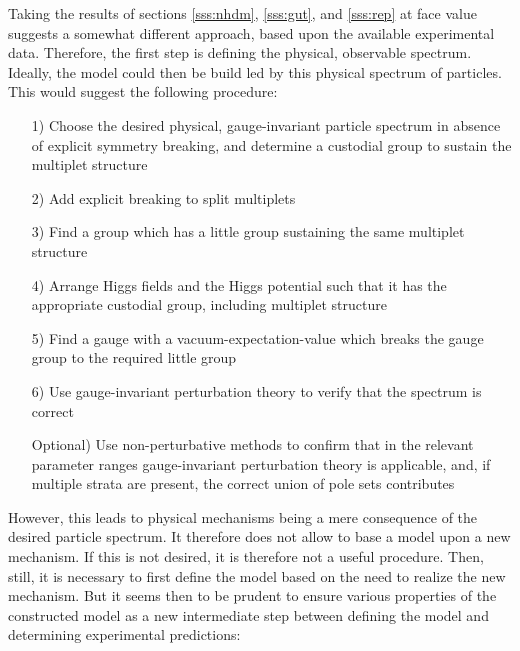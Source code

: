 \documentclass[final,twoside,12pt]{article}
\newcommand*{\1}{1\!\!\!\bot}
\begin{document}
Taking the results of sections \ref{sss:nhdm}, \ref{sss:gut}, and \ref{sss:rep} at face value suggests a somewhat different approach, based upon the available experimental data. Therefore, the first step is defining the physical, observable spectrum. Ideally, the model could then be build led by this physical spectrum of particles. This would suggest the following procedure:
\begin{itemize}
 \item[1)] Choose the desired physical, gauge-invariant particle spectrum in absence of explicit symmetry breaking, and determine a custodial group to sustain the multiplet structure
 \item[2)] Add explicit breaking to split multiplets
 \item[3)] Find a group which has a little group sustaining the same multiplet structure \cite{O'Raifeartaigh:1986vq}
 \item[4)] Arrange Higgs fields and the Higgs potential such that it has the appropriate custodial group, including multiplet structure \cite{O'Raifeartaigh:1986vq}
 \item[5)] Find a gauge with a vacuum-expectation-value which breaks the gauge group to the required little group
 \item[6)] Use gauge-invariant perturbation theory to verify that the spectrum is correct
 \item[Optional)] Use non-perturbative methods to confirm that in the relevant parameter ranges gauge-invariant perturbation theory is applicable, and, if multiple strata are present, the correct union of pole sets contributes
\end{itemize}
However, this leads to physical mechanisms being a mere consequence of the desired particle spectrum. It therefore does not allow to base a model upon a new mechanism. If this is not desired, it is therefore not a useful procedure. Then, still, it is necessary to first define the model based on the need to realize the new mechanism. But it seems then to be prudent to ensure various properties of the constructed model as a new intermediate step between defining the model and determining experimental predictions:
\end{document}
